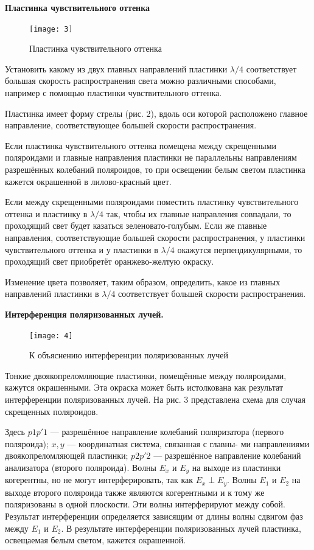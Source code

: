 \documentclass[a4paper,12pt]{article}
\begin{document}
\textbf{Пластинка чувствительного оттенка}\par
\begin{figure}
	\texttt{[image: 3]}
	\caption{Пластинка чувствительного оттенка}
	\label{ris 3}
\end{figure}

Установить какому из двух главных направлений пластинки $\lambda/4$ соответствует большая скорость распространения света можно различными способами, например с помощью пластинки чувствительного оттенка.

Пластинка имеет форму стрелы (рис. 2), вдоль оси которой расположено главное направление, соответствующее большей скорости распространения.

Если пластинка чувствительного оттенка помещена между скрещенными поляроидами и главные направления пластинки не параллельны направлениям разрешённых колебаний поляроидов, то при освещении белым светом пластинка кажется окрашенной в лилово-красный цвет.

Если между скрещенными поляроидами поместить пластинку чувствительного оттенка и пластинку в $ \lambda/4 $ так, чтобы их главные
направления совпадали, то проходящий свет будет казаться зеленовато-голубым.
Если же главные направления, соответствующие большей скорости распространения, у пластинки чувствительного оттенка и у пластинки
в $ \lambda/4 $ окажутся перпендикулярными, то проходящий свет приобретёт
оранжево-желтую окраску.

Изменение цвета позволяет, таким образом, определить, какое из
главных направлений пластинки в $ \lambda/4 $ соответствует большей скорости
распространения.

\textbf{Интерференция поляризованных лучей.}\par
\begin{figure}
	\texttt{[image: 4]}
	\caption{К объяснению интерференции поляризованных лучей}
	\label{ris 4}
\end{figure}

Тонкие двоякопреломляющие пластинки, помещённые между поляроидами, кажутся окрашенными. Эта окраска может быть истолкована как результат интерференции поляризованных лучей. На рис. 3 представлена схема для
случая скрещенных поляроидов.

Здесь $ p1p'1 $ --- разрешённое направление колебаний поляризатора
(первого поляроида); $ x, y $ --- координатная система, связанная с главны-
ми направлениями двоякопреломляющей пластинки; $ p2p'2 $ --- разрешённое направление колебаний анализатора (второго поляроида). Волны
$ E_x  $ и $ E_y $ на выходе из пластинки когерентны, но не могут интерферировать, так как $ E_x \perp  E_y $. Волны $ E_1 $ и $ E_2 $ на выходе второго поляроида
также являются когерентными и к тому же поляризованы в одной плоскости. Эти волны интерферируют между собой. Результат интерференции определяется зависящим от длины волны сдвигом фаз между $ E_1 $
и $ E_2 $. В результате интерференции поляризованных лучей пластинка, освещаемая белым светом, кажется окрашенной.
\end{document}
